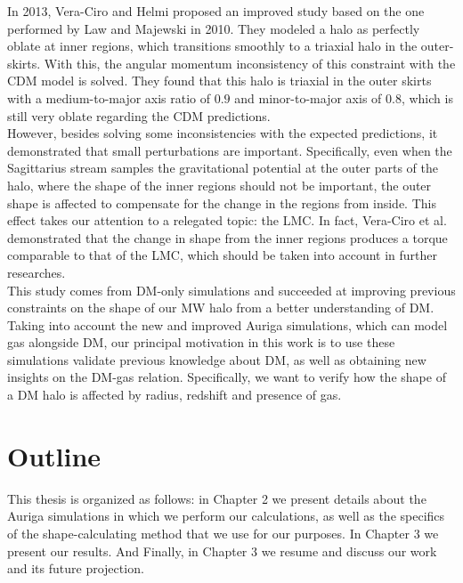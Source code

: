 In 2013, Vera-Ciro and Helmi proposed an improved study based on the one performed by Law and Majewski in 2010. They modeled a halo as perfectly oblate at inner regions, which transitions smoothly to a triaxial halo in the outer-skirts. With this, the angular momentum inconsistency of this constraint with the CDM model is solved. They found that this halo is triaxial in the outer skirts with a medium-to-major axis ratio of $0.9$ and minor-to-major axis of $0.8$, which is still very oblate regarding the CDM predictions.\\

However, besides solving some inconsistencies with the expected predictions, it demonstrated that small perturbations are important. Specifically, even when the Sagittarius stream samples the gravitational potential at the outer parts of the halo, where the shape of the inner regions should not be important, the outer shape is affected to compensate for the change in the regions from inside. This effect takes our attention to a relegated topic: the LMC. In fact, Vera-Ciro et al. demonstrated that the change in shape from the inner regions produces a torque comparable to that of the LMC, which should be taken into account in further researches.\\

This study comes from DM-only simulations and succeeded at improving previous constraints on the shape of our MW halo from a better understanding of DM. Taking into account the new and improved Auriga simulations, which can model gas alongside DM, our principal motivation in this work is to use these simulations validate previous knowledge about DM, as well as obtaining new insights on the DM-gas relation. Specifically, we want to verify how the shape of a DM halo is affected by radius, redshift and presence of gas.\\

%

\section{Outline}
This thesis is organized as follows: in Chapter 2 we present details about the Auriga simulations in which we perform our calculations, as well as the specifics of the shape-calculating method that we use for our purposes. In Chapter 3 we present our results. And Finally, in Chapter 3 we resume and discuss our work and its future projection.  
